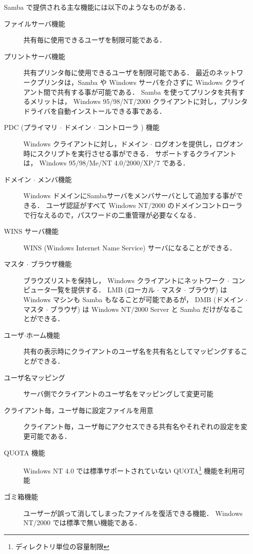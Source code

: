 Samba で提供される主な機能には以下のようなものがある．
\begin{description}
\item[ファイルサーバ機能] 共有毎に使用できるユーザを制限可能である．
\item[プリントサーバ機能] 共有プリンタ毎に使用できるユーザを制限可能である．
最近のネットワークプリンタは，Samba や Windows サーバを介さずに Windows クライアント間で共有する事が可能である．
Samba を使ってプリンタを共有するメリットは， Windows 95/98/NT/2000 クライアントに対し，プリンタドライバを自動インストールできる事である．
\item[PDC (プライマリ $\cdot$ ドメイン $\cdot$ コントローラ ) 機能]
Windows クライアントに対し，ドメイン $\cdot$ ログオンを提供し，ログオン時にスクリプトを実行させる事ができる．
サポートするクライアントは， Windows 95/98/Me/NT 4.0/2000/XP/7 である．
\item[ドメイン $\cdot$ メンバ機能]
Windows ドメインにSambaサーバをメンバサーバとして追加する事ができる．
ユーザ認証がすべて Windows NT/2000 のドメインコントローラで行なえるので，パスワードの二重管理が必要なくなる．
\item[WINS サーバ機能] WINS (Windows Internet Name Service) サーバになることができる．
\item[マスタ $\cdot$ ブラウザ機能] ブラウズリストを保持し， Windows クライアントにネットワーク $\cdot$ コンピュータ一覧を提供する． 
LMB (ローカル $\cdot$ マスタ $\cdot$ ブラウザ) は Windows マシンも Samba もなることが可能であるが，
DMB (ドメイン $\cdot$ マスタ $\cdot$ ブラウザ) は Windows NT/2000 Server と Samba だけがなることができる．
\item[ユーザ$\cdot$ホーム機能] 共有の表示時にクライアントのユーザ名を共有名としてマッピングすることができる．
\item[ユーザ名マッピング] サーバ側でクライアントのユーザ名をマッピングして変更可能
\item[クライアント毎，ユーザ毎に設定ファイルを用意] クライアント毎，ユーザ毎にアクセスできる共有名やそれぞれの設定を変更可能である．
\item[QUOTA 機能] Windows NT 4.0 では標準サポートされていない QUOTA\footnote{ディレクトリ単位の容量制限} 機能を利用可能
\item[ゴミ箱機能] ユーザーが誤って消してしまったファイルを復活できる機能． Windows NT/2000 では標準で無い機能である．
\end{description}

